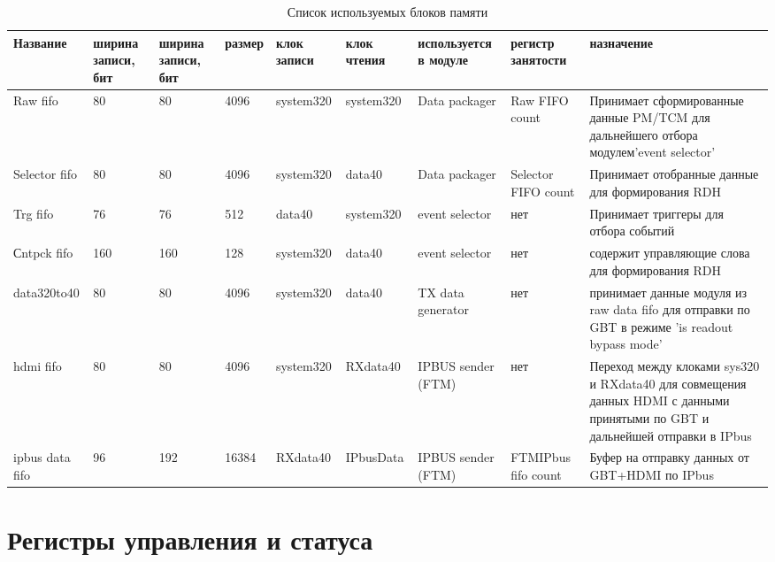 \documentclass{article}
\begin{document}
\begin{table}[H]
\begin{tabularx}{1\textwidth}{|p{}|p{1cm}|p{1cm}|p{1cm}|p{}|p{}|p{}|p{}|X|}
\hline
Название & ширина записи, бит & ширина записи, бит & размер & клок записи & клок чтения & используется в модуле & регистр занятости & назначение \\ \hline

Raw fifo & 80 & 80 & 4096 & system320 & system320 & Data packager & Raw FIFO count & Принимает сформированные данные PM/TCM для дальнейшего отбора модулем'event selector' \\ \hline

Selector fifo & 80 & 80 & 4096 & system320 & data40 & Data packager & Selector FIFO count & Принимает отобранные данные для формирования RDH \\ \hline

Trg fifo & 76 & 76 & 512 & data40 & system320 & event selector & нет & Принимает триггеры для отбора событий \\ \hline

Сntpck fifo & 160 & 160 & 128 & system320 & data40 & event selector & нет & содержит управляющие слова для формирования RDH \\ \hline

data320to40 & 80 & 80 & 4096 & system320 & data40 & TX data generator & нет & принимает данные модуля из raw data fifo для отправки по GBT в режиме 'is readout bypass mode' \\ \hline

hdmi fifo & 80 & 80 & 4096 & system320 & RXdata40 & IPBUS sender (FTM) & нет & Переход между клоками sys320 и RXdata40 для совмещения данных HDMI с данными принятыми по GBT и дальнейшей отправки в IPbus \\ \hline

ipbus data fifo & 96 & 192 & 16384 & RXdata40 & IPbusData & IPBUS sender (FTM) & FTMIPbus fifo count & Буфер на отправку данных от GBT+HDMI по IPbus \\ \hline

\end{tabularx}
\caption{Список используемых блоков памяти\label{tab0}}
\end{table}





\section{Регистры управления и статуса}
\end{document}
